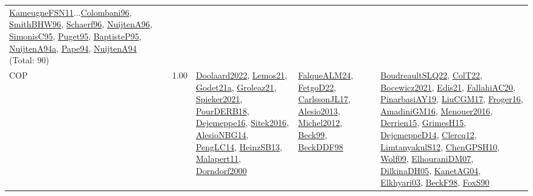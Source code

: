 {\begin{longtable}{p{3cm}r>{\raggedright\arraybackslash}p{6cm}>{\raggedright\arraybackslash}p{6cm}>{\raggedright\arraybackslash}p{8cm}}
\hyperref[detail:KameugneFSN11]{KameugneFSN11}...\hyperref[detail:Colombani96]{Colombani96}, \hyperref[detail:SmithBHW96]{SmithBHW96}, \hyperref[detail:Schaerf96]{Schaerf96}, \hyperref[detail:NuijtenA96]{NuijtenA96}, \hyperref[detail:SimonisC95]{SimonisC95}, \hyperref[detail:Puget95]{Puget95}, \hyperref[detail:BaptisteP95]{BaptisteP95}, \hyperref[detail:NuijtenA94a]{NuijtenA94a}, \hyperref[detail:Pape94]{Pape94}, \hyperref[detail:NuijtenA94]{NuijtenA94} (Total: 90)\\
\index{COP}\index{CP!COP}COP &  1.00 & \hyperref[detail:Doolaard2022]{Doolaard2022}, \hyperref[detail:Lemos21]{Lemos21}, \hyperref[detail:Godet21a]{Godet21a}, \hyperref[detail:Groleaz21]{Groleaz21}, \hyperref[detail:Spieker2021]{Spieker2021}, \hyperref[detail:PourDERB18]{PourDERB18}, \hyperref[detail:Dejemeppe16]{Dejemeppe16}, \hyperref[detail:Sitek2016]{Sitek2016}, \hyperref[detail:AlesioNBG14]{AlesioNBG14}, \hyperref[detail:PengLC14]{PengLC14}, \hyperref[detail:HeinzSB13]{HeinzSB13}, \hyperref[detail:Malapert11]{Malapert11}, \hyperref[detail:Dorndorf2000]{Dorndorf2000} & \hyperref[detail:FalqueALM24]{FalqueALM24}, \hyperref[detail:FetgoD22]{FetgoD22}, \hyperref[detail:CarlssonJL17]{CarlssonJL17}, \hyperref[detail:Alesio2013]{Alesio2013}, \hyperref[detail:Michel2012]{Michel2012}, \hyperref[detail:Beck99]{Beck99}, \hyperref[detail:BeckDDF98]{BeckDDF98} & \hyperref[detail:BoudreaultSLQ22]{BoudreaultSLQ22}, \hyperref[detail:ColT22]{ColT22}, \hyperref[detail:Bocewicz2021]{Bocewicz2021}, \hyperref[detail:Edis21]{Edis21}, \hyperref[detail:FallahiAC20]{FallahiAC20}, \hyperref[detail:PinarbasiAY19]{PinarbasiAY19}, \hyperref[detail:LiuCGM17]{LiuCGM17}, \hyperref[detail:Froger16]{Froger16}, \hyperref[detail:AmadiniGM16]{AmadiniGM16}, \hyperref[detail:Menouer2016]{Menouer2016}, \hyperref[detail:Derrien15]{Derrien15}, \hyperref[detail:GrimesH15]{GrimesH15}, \hyperref[detail:DejemeppeD14]{DejemeppeD14}, \hyperref[detail:Clercq12]{Clercq12}, \hyperref[detail:LimtanyakulS12]{LimtanyakulS12}, \hyperref[detail:ChenGPSH10]{ChenGPSH10}, \hyperref[detail:Wolf09]{Wolf09}, \hyperref[detail:ElhouraniDM07]{ElhouraniDM07}, \hyperref[detail:DilkinaDH05]{DilkinaDH05}, \hyperref[detail:KanetAG04]{KanetAG04}, \hyperref[detail:Elkhyari03]{Elkhyari03}, \hyperref[detail:BeckF98]{BeckF98}, \hyperref[detail:FoxS90]{FoxS90}\\

\end{longtable}}
